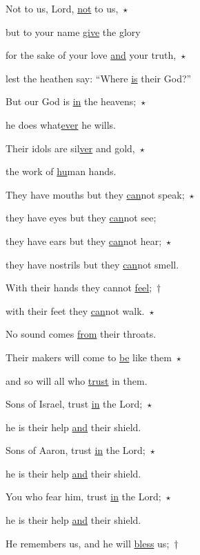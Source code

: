 \noindent Not to us, Lord, \uline{not} to us,~$\star$~\nopagebreak

but to your name \uline{give} the glory

\noindent for the sake of your love \uline{and} your truth,~$\star$~\nopagebreak

lest the heathen say: “Where \uline{is} their God?”



\noindent But our God is \uline{in} the heavens;~$\star$~\nopagebreak

he does what\uline{ever} he wills.

\noindent Their idols are sil\uline{ver} and gold,~$\star$~\nopagebreak

the work of \uline{hu}man hands.



\noindent They have mouths but they \uline{can}not speak;~$\star$~\nopagebreak

they have eyes but they \uline{can}not see;

\noindent they have ears but they \uline{can}not hear;~$\star$~\nopagebreak

they have nostrils but they \uline{can}not smell.



\noindent With their hands they cannot \uline{feel};~†~

with their feet they \uline{can}not walk.~$\star$~\nopagebreak

No sound comes \uline{from} their throats.



\noindent Their makers will come to \uline{be} like them~$\star$~\nopagebreak

and so will all who \uline{trust} in them.



\noindent Sons of Israel, trust \uline{in} the Lord;~$\star$~\nopagebreak

he is their help \uline{and} their shield.

\noindent Sons of Aaron, trust \uline{in} the Lord;~$\star$~\nopagebreak

he is their help \uline{and} their shield.



\noindent You who fear him, trust \uline{in} the Lord;~$\star$~\nopagebreak

he is their help \uline{and} their shield.

\noindent He remembers us, and he will \uline{bless} us;~†~


